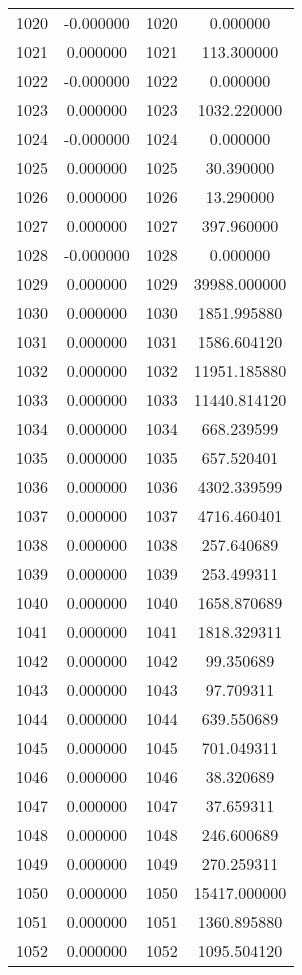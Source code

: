 \documentclass[12pt]{article}
\begin{document}
\begin{longtable}{@{}cccc@{}}
1020 & -0.000000 & 1020 & 0.000000 \\
1021 & 0.000000 & 1021 & 113.300000 \\
1022 & -0.000000 & 1022 & 0.000000 \\
1023 & 0.000000 & 1023 & 1032.220000 \\
1024 & -0.000000 & 1024 & 0.000000 \\
1025 & 0.000000 & 1025 & 30.390000 \\
1026 & 0.000000 & 1026 & 13.290000 \\
1027 & 0.000000 & 1027 & 397.960000 \\
1028 & -0.000000 & 1028 & 0.000000 \\
1029 & 0.000000 & 1029 & 39988.000000 \\
1030 & 0.000000 & 1030 & 1851.995880 \\
1031 & 0.000000 & 1031 & 1586.604120 \\
1032 & 0.000000 & 1032 & 11951.185880 \\
1033 & 0.000000 & 1033 & 11440.814120 \\
1034 & 0.000000 & 1034 & 668.239599 \\
1035 & 0.000000 & 1035 & 657.520401 \\
1036 & 0.000000 & 1036 & 4302.339599 \\
1037 & 0.000000 & 1037 & 4716.460401 \\
1038 & 0.000000 & 1038 & 257.640689 \\
1039 & 0.000000 & 1039 & 253.499311 \\
1040 & 0.000000 & 1040 & 1658.870689 \\
1041 & 0.000000 & 1041 & 1818.329311 \\
1042 & 0.000000 & 1042 & 99.350689 \\
1043 & 0.000000 & 1043 & 97.709311 \\
1044 & 0.000000 & 1044 & 639.550689 \\
1045 & 0.000000 & 1045 & 701.049311 \\
1046 & 0.000000 & 1046 & 38.320689 \\
1047 & 0.000000 & 1047 & 37.659311 \\
1048 & 0.000000 & 1048 & 246.600689 \\
1049 & 0.000000 & 1049 & 270.259311 \\
1050 & 0.000000 & 1050 & 15417.000000 \\
1051 & 0.000000 & 1051 & 1360.895880 \\
1052 & 0.000000 & 1052 & 1095.504120 \\

\end{longtable}
\end{document}

